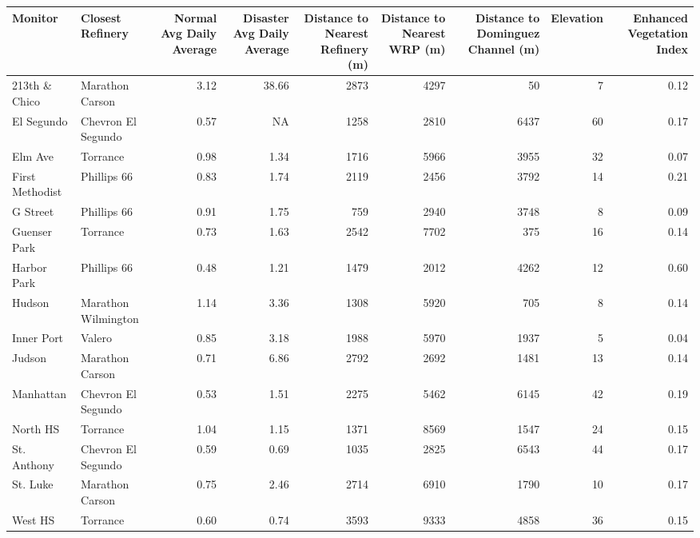 
\begin{tabular}{l|l|r|r|r|r|r|r|r}
\hline
Monitor & Closest Refinery & Normal Avg Daily Average & Disaster Avg Daily Average & Distance to Nearest Refinery (m) & Distance to Nearest WRP (m) & Distance to Dominguez Channel (m) & Elevation & Enhanced Vegetation Index\\
\hline
213th \& Chico & Marathon Carson & 3.12 & 38.66 & 2873 & 4297 & 50 & 7 & 0.12\\
\hline
El Segundo & Chevron El Segundo & 0.57 & NA & 1258 & 2810 & 6437 & 60 & 0.17\\
\hline
Elm Ave & Torrance & 0.98 & 1.34 & 1716 & 5966 & 3955 & 32 & 0.07\\
\hline
First Methodist & Phillips 66 & 0.83 & 1.74 & 2119 & 2456 & 3792 & 14 & 0.21\\
\hline
G Street & Phillips 66 & 0.91 & 1.75 & 759 & 2940 & 3748 & 8 & 0.09\\
\hline
Guenser Park & Torrance & 0.73 & 1.63 & 2542 & 7702 & 375 & 16 & 0.14\\
\hline
Harbor Park & Phillips 66 & 0.48 & 1.21 & 1479 & 2012 & 4262 & 12 & 0.60\\
\hline
Hudson & Marathon Wilmington & 1.14 & 3.36 & 1308 & 5920 & 705 & 8 & 0.14\\
\hline
Inner Port & Valero & 0.85 & 3.18 & 1988 & 5970 & 1937 & 5 & 0.04\\
\hline
Judson & Marathon Carson & 0.71 & 6.86 & 2792 & 2692 & 1481 & 13 & 0.14\\
\hline
Manhattan & Chevron El Segundo & 0.53 & 1.51 & 2275 & 5462 & 6145 & 42 & 0.19\\
\hline
North HS & Torrance & 1.04 & 1.15 & 1371 & 8569 & 1547 & 24 & 0.15\\
\hline
St. Anthony & Chevron El Segundo & 0.59 & 0.69 & 1035 & 2825 & 6543 & 44 & 0.17\\
\hline
St. Luke & Marathon Carson & 0.75 & 2.46 & 2714 & 6910 & 1790 & 10 & 0.17\\
\hline
West HS & Torrance & 0.60 & 0.74 & 3593 & 9333 & 4858 & 36 & 0.15\\
\hline
\end{tabular}
